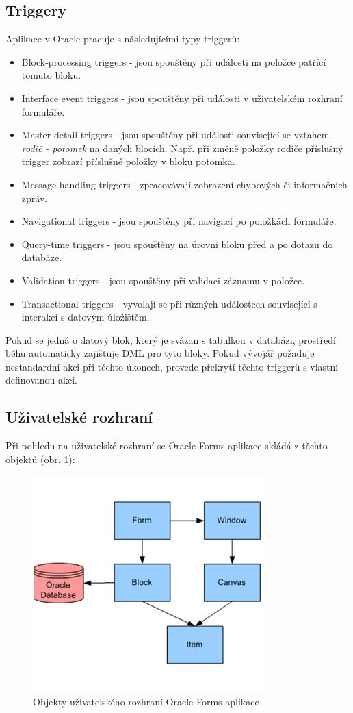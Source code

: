 \documentclass{diplomka}
\begin{document}
\subsection*{Triggery}
Aplikace v Oracle pracuje s následujícími typy triggerů:
\begin{itemize}
\item Block-processing triggers - jsou spouštěny při události na položce patřící tomuto bloku.
\item Interface event triggers - jsou spouštěny při události v uživatelském rozhraní formuláře.
\item Master-detail triggers - jsou spouštěny při události související se vztahem \emph{rodič - potomek} na daných blocích. Např. při změně položky rodiče příslušný trigger zobrazí příslušné položky v bloku potomka.
\item Message-handling triggers - zpracovávají zobrazení chybových či informačních zpráv.
\item Navigational triggers - jsou spouštěny při navigaci po položkách formuláře.
\item Query-time triggers - jsou spouštěny na úrovni bloku před a po dotazu do databáze.
\item Validation triggers - jsou spouštěny při validaci záznamu v položce.
\item Transactional triggers - vyvolají se při různých událostech související s interakcí s datovým úložištěm.
\end{itemize}
Pokud se jedná o datový blok, který je svázan s tabulkou v databázi, prostředí běhu automaticky zajištuje DML pro tyto bloky.
Pokud vývojář požaduje nestandardní akci při těchto úkonech, provede překrytí těchto triggerů s vlastní definovanou akcí.
\newpage
\subsection{Uživatelské rozhraní}
Při pohledu na uživatelské rozhraní se Oracle Forms aplikace skládá z těchto objektů (obr. \ref{fig:gui}):
\begin{figure}[H]
  \centering
  \includegraphics[scale=0.8]{obr/window.png}
\caption{Objekty uživatelského rozhraní Oracle Forms aplikace\cite{microsoft}}
\label{fig:gui}
\end{figure}
\end{document}
